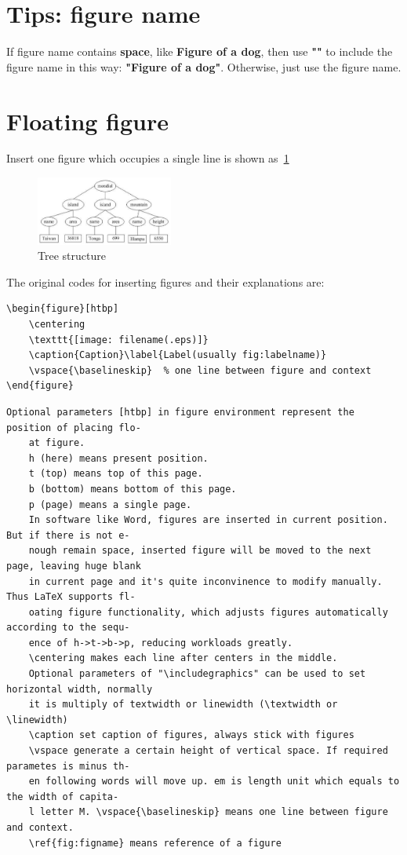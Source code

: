 \section{Tips: figure name}
If figure name contains \textbf{space}, like \textbf{Figure of a dog}, then use \textbf{""} to include the figure name in this way: \textbf{"Figure of a dog"}. Otherwise, just use the figure name.

\section{Floating figure}
Insert one figure which occupies a single line is shown as~\ref{fig:xml}
\begin{figure}[htbp]
	\centering
	\includegraphics[width=0.4\textwidth]{figures/XML.pdf}
	\caption{Tree structure}\label{fig:xml}
	\vspace{\baselineskip}
\end{figure}

The original codes for inserting figures and their explanations are:

\begin{lstlisting}[language={[LaTeX]TeX}]
\begin{figure}[htbp]
	\centering
	\texttt{[image: filename(.eps)]}
	\caption{Caption}\label{Label(usually fig:labelname)}
	\vspace{\baselineskip}  % one line between figure and context
\end{figure}
\end{lstlisting}

\begin{lstlisting}[language={[LaTeX]TeX}]
	Optional parameters [htbp] in figure environment represent the position of placing flo-
	at figure.
	h (here) means present position.
	t (top) means top of this page.
	b (bottom) means bottom of this page. 
	p (page) means a single page.
	In software like Word, figures are inserted in current position. But if there is not e-
	nough remain space, inserted figure will be moved to the next page, leaving huge blank 
	in current page and it's quite inconvinence to modify manually. Thus LaTeX supports fl-
	oating figure functionality, which adjusts figures automatically according to the sequ-
	ence of h->t->b->p, reducing workloads greatly.
	\centering makes each line after centers in the middle.
	Optional parameters of "\includegraphics" can be used to set horizontal width, normally
	it is multiply of textwidth or linewidth (\textwidth or \linewidth)
	\caption set caption of figures, always stick with figures
	\vspace generate a certain height of vertical space. If required parametes is minus th-
	en following words will move up. em is length unit which equals to the width of capita-
	l letter M. \vspace{\baselineskip} means one line between figure and context.
	\ref{fig:figname} means reference of a figure
\end{lstlisting}

